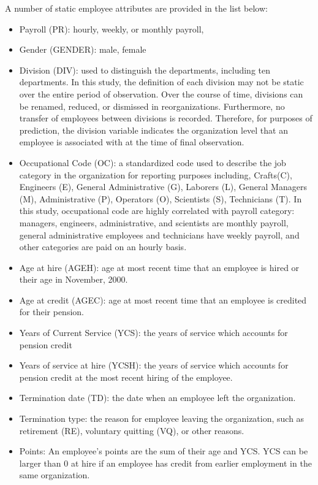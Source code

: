 \documentclass[12pt,letterpaper]{article}
\begin{document}
A number of static employee attributes are provided in the list below:
\begin{itemize}
	\item Payroll (PR): hourly, weekly, or monthly payroll,
	\item Gender (GENDER): male, female
	\item Division (DIV): used to distinguish the departments, including ten departments. In this study, the definition of each division may not be static over the entire period of observation. Over the course of time, divisions can be renamed, reduced, or dismissed in reorganizations. Furthermore, no transfer of employees between divisions is recorded.  Therefore, for purposes of prediction, the division variable indicates the organization level that an employee is associated with at the time of final observation.
		
	\item Occupational Code (OC): a standardized code used to describe the job category in the organization for reporting purposes including, Crafts(C), Engineers (E), General Administrative (G), Laborers (L), General Managers (M),  Administrative (P),  Operators (O), Scientists (S), Technicians (T). In this study, occupational code are highly correlated with payroll category: managers, engineers, administrative, and scientists are monthly payroll, general administrative employees and technicians have weekly payroll, and other categories are paid on an hourly basis.
	\item Age at hire (AGEH): age at most recent time that an employee is hired or their age in November, 2000.
	\item Age at credit (AGEC): age at most recent time that an employee is credited for their pension.
	\item Years of Current Service (YCS): the years of service which accounts for pension credit
	\item Years of service at hire (YCSH): the years of service which accounts for pension credit at the most recent hiring of the employee.
	\item Termination date (TD): the date when an employee left the organization.
	\item Termination type: the reason for employee leaving the organization, such as retirement (RE),  voluntary quitting (VQ), or other reasons.
	\item Points: An employee's points are the sum of their age and YCS.  YCS can be larger than 0 at hire if an employee has credit from earlier employment in the same organization.
\end{itemize}
\end{document}
